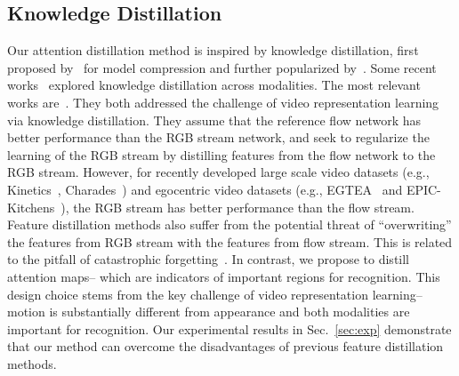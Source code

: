 \documentclass{bmvc2k}
\begin{document}
\subsection{Knowledge Distillation}
Our attention distillation method is inspired by knowledge distillation, first proposed by~\cite{bucilu2006model} for model compression and further popularized by~\cite{hinton2015distilling}. Some recent works~\cite{gupta2016cross,garcia2018modality,luo2018graph} explored knowledge distillation across modalities. The most relevant works are~\cite{stroud2020d3d,crasto2019mars}. They both addressed the challenge of video representation learning via knowledge distillation. They assume that the reference flow network has better performance than the RGB stream network, and seek to regularize the learning of the RGB stream by distilling features from the flow network to the RGB stream. However, for recently developed large scale video datasets (e.g., Kinetics~\cite{kay2017kinetics}, Charades~\cite{sigurdsson2016hollywood}) and egocentric video datasets (e.g., EGTEA~\cite{Li_2018_ECCV} and EPIC-Kitchens~\cite{damen2018scaling}), the RGB stream has better performance than the flow stream. Feature distillation methods also suffer from the potential threat of ``overwriting'' the features from RGB stream with the features from flow stream. This is related to the pitfall of catastrophic forgetting~\cite{french1999catastrophic}.  In contrast, we propose to distill attention maps-- which are indicators of important regions for recognition. This design choice stems from the key challenge of video representation learning--motion is substantially different from appearance and both modalities are important for recognition. Our experimental results in Sec.~\ref{sec:exp} demonstrate that our method can overcome the disadvantages of previous feature distillation methods.
\end{document}

